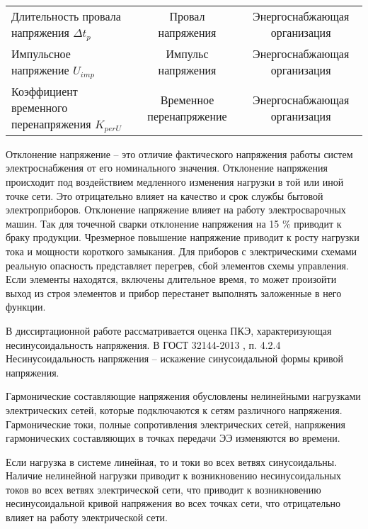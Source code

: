\begin{table} [p]
\begin{SingleSpace}
\begin{tabulary}{\textwidth}{@{}>{\zz}L >{\zz}C >{\zz}C @{}}
			Длительность провала напряжения ${\Delta t_p}$ & %
			Провал напряжения &
			Энергоснабжающая организация \\
			
			Импульсное напряжение ${U_{imp}}$ &
			Импульс напряжения &
			Энергоснабжающая организация \\
			
			Коэффициент временного перенапряжения ${K_{per U}}$ &
			Временное перенапряжение &
			Энергоснабжающая организация \\
			
			\bottomrule %
		\end{tabulary}%
	\end{SingleSpace}
\end{table}

Отклонение напряжение – это отличие фактического напряжения работы систем электроснабжения от его номинального значения. Отклонение напряжения происходит под воздействием медленного изменения нагрузки в той или иной точке сети. Это отрицательно влияет на качество и срок службы бытовой электроприборов. Отклонение напряжение влияет на работу электросварочных машин. Так для точечной сварки отклонение напряжения на 15 \% приводит к браку продукции. Чрезмерное повышение напряжение приводит к росту нагрузки тока и мощности короткого замыкания. Для приборов с электрическими схемами реальную опасность представляет перегрев, сбой элементов схемы управления. Если элементы находятся, включены длительное время, то может произойти выход из строя элементов и прибор перестанет выполнять заложенные в него функции.

В диссиртационной работе рассматривается оценка ПКЭ, характеризующая несинусоидальность напряжения. В ГОСТ 32144-2013 \cite{ГОСТ32144-2013}, п. 4.2.4 Несинусоидальность напряжения – искажение синусоидальной формы кривой напряжения.

Гармонические составляющие напряжения обусловлены нелинейными нагрузками электрических сетей, которые подключаются к сетям различного напряжения. Гармонические токи, полные сопротивления электрических сетей, напряжения гармонических составляющих в точках передачи ЭЭ изменяются во времени.

Если нагрузка в системе линейная, то и токи во всех ветвях синусоидальны. Наличие нелинейной нагрузки приводит к возникновению несинусоидальных токов во всех ветвях электрической сети, что приводит к возникновению несинусоидальной кривой напряжения во всех точках сети, что отрицательно влияет на работу электрической сети. 

